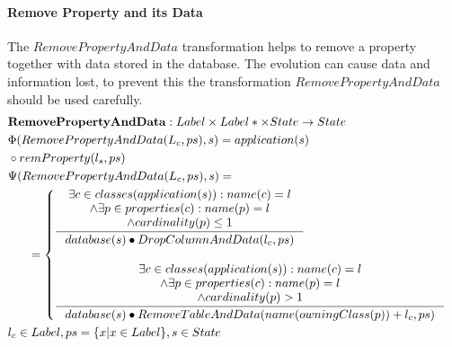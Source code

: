 \documentclass[11pt]{article}
\begin{document}
\paragraph{Remove Property and its Data} The $RemovePropertyAndData$ transformation helps to remove a property together with data stored in the database. The evolution can cause data and information lost, to prevent this the transformation $RemovePropertyAndData$ should be used carefully.
\begin{align*}
&	\mathbf{RemovePropertyAndData} : Label \times Label* \times State \rightarrow State \\
&	\Phi(RemovePropertyAndData(L_c, ps), s) = application(s)\\ 
&  \circ remProperty(l_s, ps) \\
&	\Psi(RemovePropertyAndData(L_c, ps), s) = \\
& \;\;\;\;\;\; = \begin{cases}
 		\inference{\exists c \in classes(application(s)) : name(c) = l\\ 	\wedge \exists p \in properties(c) : name(p) = l \\ \wedge cardinality(p) \leq 1}{database(s) \bullet DropColumnAndData(l_c, ps)}\\\\
 	\inference{\exists c \in classes(application(s)) : name(c) = l\\ 	\wedge \exists p \in properties(c) : name(p) = l \\ \wedge cardinality(p) > 1}{database(s) \bullet RemoveTableAndData(name(owningClass(p))+l_c, ps)}
 \end{cases}
	\\
&	l_c \in Label, ps = \{x | x \in Label\}, s \in State
\end{align*}
\end{document}
